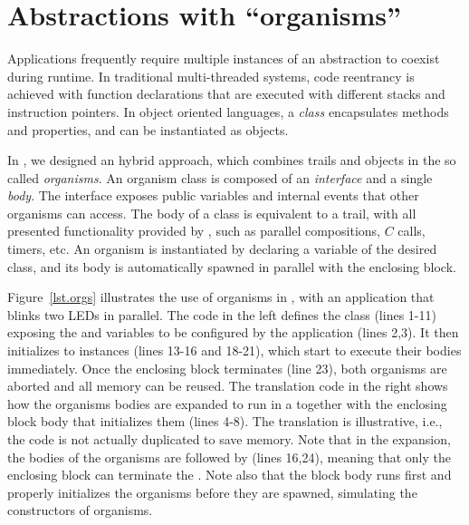 \section{Abstractions with ``organisms''}
\label{sec.orgs}

Applications frequently require multiple instances of an abstraction to coexist 
during runtime.
%
%
In traditional multi-threaded systems, code reentrancy is achieved with 
function declarations that are executed with different stacks and instruction 
pointers.
In object oriented languages, a \emph{class} encapsulates methods and 
properties, and can be instantiated as objects.

In \CEU, we designed an hybrid approach, which combines trails and objects in 
the so called \emph{organisms}.
An organism class is composed of an \emph{interface} and a single \emph{body}.
The interface exposes public variables and internal events that other organisms 
can access.
The body of a class is equivalent to a trail, with all presented functionality 
provided by \CEU, such as parallel compositions, $C$ calls, timers, etc.
An organism is instantiated by declaring a variable of the desired class, and 
its body is automatically spawned in parallel with the enclosing block.

Figure~\ref{lst.orgs} illustrates the use of organisms in \CEU, with an 
application that blinks two LEDs in parallel.
%
The code in the left defines the  class (lines 1-11) exposing the 
 and  variables to be configured by the application (lines 
2,3).
It then initializes to instances (lines 13-16 and 18-21), which start to 
execute their bodies immediately.
%
Once the enclosing block terminates (line 23), both organisms are aborted and 
all memory can be reused.
%
The translation code in the right shows how the organisms bodies are expanded 
to run in a  together with the enclosing block body that 
initializes them (lines 4-8).
The translation is illustrative, i.e., the code is not actually duplicated to 
save memory.
Note that in the expansion, the bodies of the organisms are followed by 
 (lines 16,24), meaning that only the enclosing block can 
terminate the .
Note also that the block body runs first and properly initializes the organisms 
before they are spawned, simulating the constructors of organisms.

